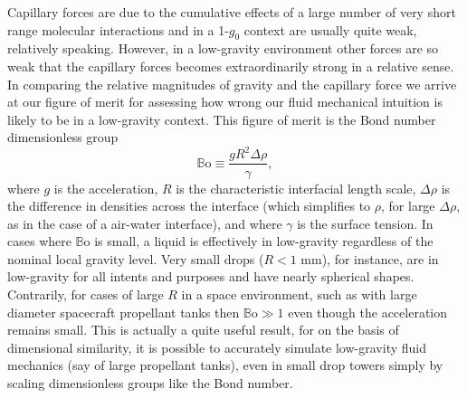 \documentclass[12pt,a4paper,oneside]{book}
\begin{document}
Capillary forces are due to the cumulative effects of a large number of very short range molecular interactions and in a 1-$g_0$ context are usually quite weak, relatively speaking. However, in a low-gravity environment other forces are so weak that the capillary forces becomes extraordinarily strong in a relative sense. In comparing the relative magnitudes of gravity and the capillary force we arrive at our figure of merit for assessing how wrong our fluid mechanical intuition is likely to be in a low-gravity context. This figure of merit is the Bond number dimensionless group
\[ \mathbb{B}\mbox{o} \equiv \frac{g R^2 \Delta \rho}{\gamma}, 
\]
where $g$ is the acceleration, $R$ is the characteristic interfacial length scale, $\Delta \rho$ is the difference in densities across the interface (which simplifies to $\rho$, for large $\Delta \rho$, as in the case of a air-water interface), and where $\gamma$ is the surface tension. In cases where $\mathbb{B}\mbox{o}$ is small, a liquid is effectively in low-gravity regardless of the nominal local gravity level. Very small drops ($R < 1$ mm), for instance, are in low-gravity for all intents and purposes and have nearly spherical shapes. Contrarily, for cases of large $R$ in a space environment, such as with large diameter spacecraft propellant tanks then $ \mathbb{B}\mbox{o} \gg 1$ even though the acceleration remains small. This is actually a quite useful result, for on the basis of dimensional similarity, it is possible to accurately simulate low-gravity fluid mechanics (say of large propellant tanks), even in small drop towers simply by scaling dimensionless groups like the Bond number. 
\end{document}
